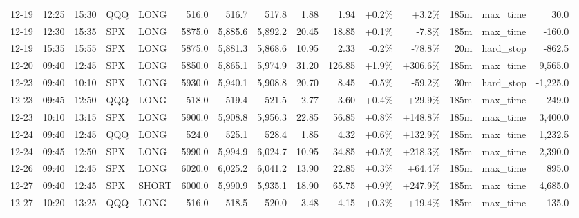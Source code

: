 \documentclass[11pt,a4paper,twoside]{article}
\begin{document}
\begin{landscape}
\begin{center}
\begin{longtable}{>{\color{txtmain}}l l l l l r r r r r r r r >{\color{txtmain}}l r}
12-19 & 12:25 & 15:30 & QQQ & LONG & 516.0 & 516.7 & 517.8 & 1.88 & 1.94 & \textcolor{wingreen}{+0.2\%} & \textcolor{wingreen}{+3.2\%} & 185m & max\_time & \textcolor{wingreen}{30.0} \\
12-19 & 12:30 & 15:35 & SPX & LONG & 5875.0 & 5,885.6 & 5,892.2 & 20.45 & 18.85 & \textcolor{wingreen}{+0.1\%} & \textcolor{lossred}{-7.8\%} & 185m & max\_time & \textcolor{lossred}{-160.0} \\
12-19 & 15:35 & 15:55 & SPX & LONG & 5875.0 & 5,881.3 & 5,868.6 & 10.95 & 2.33 & \textcolor{lossred}{-0.2\%} & \textcolor{lossred}{-78.8\%} & 20m & hard\_stop & \textcolor{lossred}{-862.5} \\
12-20 & 09:40 & 12:45 & SPX & LONG & 5850.0 & 5,865.1 & 5,974.9 & 31.20 & 126.85 & \textcolor{wingreen}{+1.9\%} & \textcolor{wingreen}{+306.6\%} & 185m & max\_time & \textcolor{wingreen}{9,565.0} \\
12-23 & 09:40 & 10:10 & SPX & LONG & 5930.0 & 5,940.1 & 5,908.8 & 20.70 & 8.45 & \textcolor{lossred}{-0.5\%} & \textcolor{lossred}{-59.2\%} & 30m & hard\_stop & \textcolor{lossred}{-1,225.0} \\
12-23 & 09:45 & 12:50 & QQQ & LONG & 518.0 & 519.4 & 521.5 & 2.77 & 3.60 & \textcolor{wingreen}{+0.4\%} & \textcolor{wingreen}{+29.9\%} & 185m & max\_time & \textcolor{wingreen}{249.0} \\
12-23 & 10:10 & 13:15 & SPX & LONG & 5900.0 & 5,908.8 & 5,956.3 & 22.85 & 56.85 & \textcolor{wingreen}{+0.8\%} & \textcolor{wingreen}{+148.8\%} & 185m & max\_time & \textcolor{wingreen}{3,400.0} \\
12-24 & 09:40 & 12:45 & QQQ & LONG & 524.0 & 525.1 & 528.4 & 1.85 & 4.32 & \textcolor{wingreen}{+0.6\%} & \textcolor{wingreen}{+132.9\%} & 185m & max\_time & \textcolor{wingreen}{1,232.5} \\
12-24 & 09:45 & 12:50 & SPX & LONG & 5990.0 & 5,994.9 & 6,024.7 & 10.95 & 34.85 & \textcolor{wingreen}{+0.5\%} & \textcolor{wingreen}{+218.3\%} & 185m & max\_time & \textcolor{wingreen}{2,390.0} \\
12-26 & 09:40 & 12:45 & SPX & LONG & 6020.0 & 6,025.2 & 6,041.2 & 13.90 & 22.85 & \textcolor{wingreen}{+0.3\%} & \textcolor{wingreen}{+64.4\%} & 185m & max\_time & \textcolor{wingreen}{895.0} \\
12-27 & 09:40 & 12:45 & SPX & SHORT & 6000.0 & 5,990.9 & 5,935.1 & 18.90 & 65.75 & \textcolor{wingreen}{+0.9\%} & \textcolor{wingreen}{+247.9\%} & 185m & max\_time & \textcolor{wingreen}{4,685.0} \\
12-27 & 10:20 & 13:25 & QQQ & LONG & 516.0 & 518.5 & 520.0 & 3.48 & 4.15 & \textcolor{wingreen}{+0.3\%} & \textcolor{wingreen}{+19.4\%} & 185m & max\_time & \textcolor{wingreen}{135.0} \\

\end{longtable}
\end{center}
\end{landscape}
\end{document}
